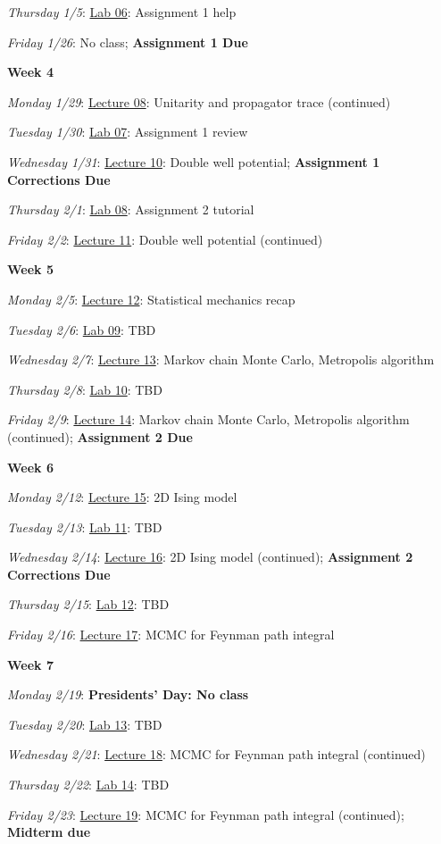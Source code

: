 \documentclass[12pt]{article}
\begin{document}
\emph{Thursday 1/5}: \underline{Lab 06}: Assignment 1 help

\emph{Friday 1/26}: No class; \textbf{Assignment 1 Due}

\noindent\textbf{Week 4}

\emph{Monday 1/29}: \underline{Lecture 08}:  Unitarity and propagator trace (continued)

\emph{Tuesday 1/30}: \underline{Lab 07}: Assignment 1 review

\emph{Wednesday 1/31}: \underline{Lecture 10}: Double well potential; \textbf{Assignment 1 Corrections Due}

\emph{Thursday 2/1}: \underline{Lab 08}: Assignment 2 tutorial

\emph{Friday 2/2}: \underline{Lecture 11}: Double well potential (continued)

\noindent\textbf{Week 5}

\emph{Monday 2/5}: \underline{Lecture 12}: Statistical mechanics recap

\emph{Tuesday 2/6}: \underline{Lab 09}: TBD

\emph{Wednesday 2/7}: \underline{Lecture 13}: Markov chain Monte Carlo, Metropolis algorithm

\emph{Thursday 2/8}: \underline{Lab 10}: TBD

\emph{Friday 2/9}: \underline{Lecture 14}: Markov chain Monte Carlo, Metropolis algorithm (continued); \textbf{Assignment 2 Due}

\noindent\textbf{Week 6}

\emph{Monday 2/12}: \underline{Lecture 15}: 2D Ising model

\emph{Tuesday 2/13}: \underline{Lab 11}: TBD

\emph{Wednesday 2/14}: \underline{Lecture 16}: 2D Ising model (continued); \textbf{Assignment 2 Corrections Due}

\emph{Thursday 2/15}: \underline{Lab 12}: TBD

\emph{Friday 2/16}: \underline{Lecture 17}: MCMC for Feynman path integral

\noindent\textbf{Week 7}

\emph{Monday 2/19}: \textbf{Presidents' Day: No class}

\emph{Tuesday 2/20}: \underline{Lab 13}: TBD

\emph{Wednesday 2/21}: \underline{Lecture 18}: MCMC for Feynman path integral (continued)

\emph{Thursday 2/22}: \underline{Lab 14}: TBD

\emph{Friday 2/23}: \underline{Lecture 19}: MCMC for Feynman path integral (continued); \textbf{Midterm due}
\end{document}

